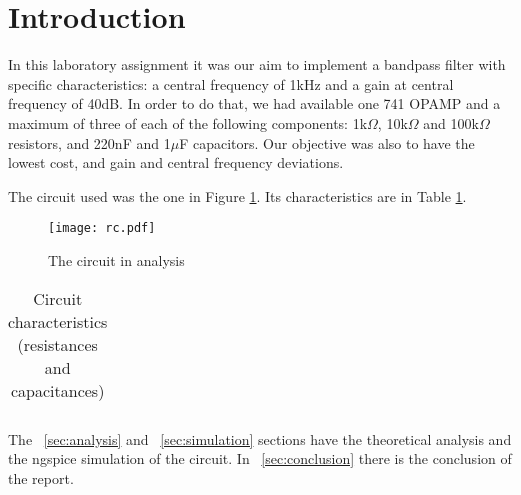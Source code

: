 \section{Introduction}
\label {sec:introduction}


In this laboratory assignment it was our aim to implement a bandpass filter with specific characteristics: a central frequency of 1kHz and a gain at central frequency of 40dB. In order to do that, we had available one 741 OPAMP and a maximum of three of each of the following components: 1k$\Omega$, 10k$\Omega$ and 100k$\Omega$ resistors, and 220nF and 1$\mu$F capacitors. Our objective was also to have the lowest cost, and gain and central frequency deviations.

The circuit used was the one in Figure \ref{fig:circuit}. Its characteristics are in Table \ref{tab:circuit}.


\begin{figure}[H] \centering
\texttt{[image: rc.pdf]}
\caption{The circuit in analysis}
\label{fig:circuit}
\end{figure}


\begin{table}[H]
  \centering
  \begin{tabular}{|c|c|}
    \hline
      
  \end{tabular}
  \caption{Circuit characteristics (resistances and capacitances)}
  \label{tab:circuit}
\end{table}


%      

The ~\ref{sec:analysis} and ~\ref{sec:simulation} sections have the theoretical analysis and the ngspice simulation of the circuit. In ~\ref{sec:conclusion} there is the conclusion of the report.
